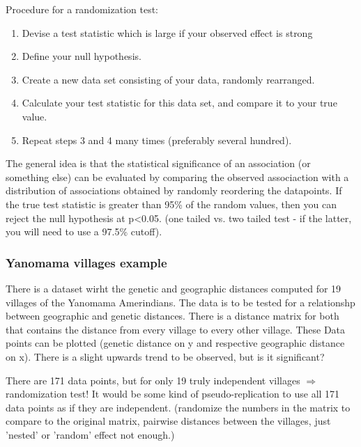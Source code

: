 \documentclass{article}
\begin{document}
Procedure for a randomization test:

\begin{enumerate}
    \item Devise a test statistic which is large if your observed effect is strong
    \item Define your null hypothesis.
    \item Create a new data set consisting of your data, randomly rearranged. 
    \item Calculate your test statistic for this data set, and compare it to your true value. 
    \item Repeat steps 3 and 4 many times (preferably several hundred).
\end{enumerate}

The general idea is that the statistical significance of an association (or something else) can be evaluated by comparing the observed associaction with a distribution of associations obtained by randomly reordering the datapoints. If the true test statistic is greater than 95\% of the random values, then you can reject the null hypothesis at p<0.05. (one tailed vs. two tailed test - if the latter, you will need to use a 97.5\% cutoff). 

\subsubsection{Yanomama villages example}
There is a dataset wirht the genetic and geographic distances computed for 19 villages of the Yanomama Amerindians. The data is to be tested for a relationshp between geographic and genetic distances. There is a distance matrix for both that contains the distance from every village to every other village. These Data points can be plotted (genetic distance on y and respective geographic distance on x). There is a slight upwards trend to be observed, but is it significant?\par 
There are 171 data points, but for only 19 truly independent villages $\Rightarrow$ randomization test! It would be some kind of pseudo-replication to use all 171 data points as if they are independent. (randomize the numbers in the matrix to compare to the original matrix, pairwise distances between the villages, just 'nested' or 'random' effect not enough.)
\end{document}
